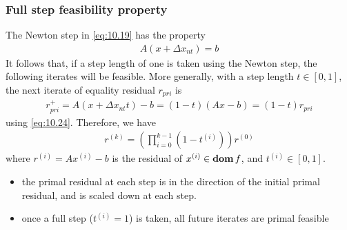 \subsubsection{Full step feasibility property}
The Newton step in \eqref{eq:10.19} has the property
\begin{align}
  A(x+\Delta x_{nt})=b\label{eq:10.24}
\end{align}
It follows that, if a step length of one is taken using the Newton step, the following iterates will be feasible.
More generally, with a step length $t\in[0,1]$, the next iterate of equality residual $r_{pri}$ is
\begin{align*}
  r_{pri}^+=A(x+\Delta x_{nt}t)-b=(1-t)(Ax-b)=(1-t)r_{pri}
\end{align*}
using \eqref{eq:10.24}. Therefore, we have
\begin{align*}
  r^{(k)}=\left(\prod_{i=0}^{k-1}(1-t^{(i)})\right)r^{(0)}
\end{align*}
where $r^{(i)}=Ax^{(i)}-b$ is the residual of $x^{(i)}\in\mathop{\bf dom} f$, and $t^{(i)}\in[0,1]$.
\begin{itemize}
  \item the primal residual at each step is in the direction of the initial primal residual, and is scaled down at each step.
  \item once a full step ($t^{(i)}=1$) is taken, all future iterates are primal feasible
\end{itemize}

